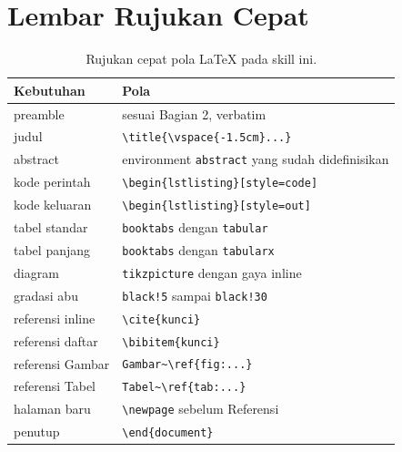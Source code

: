 \documentclass[11pt,a4paper]{article}
\begin{document}
\section{Lembar Rujukan Cepat}

\begin{table}[H]
	\centering
	\caption{Rujukan cepat pola LaTeX pada skill ini.}
	\label{tab:cheat}
	\footnotesize
	\begin{tabularx}{\textwidth}{l X}
		\toprule
		Kebutuhan        & Pola                                                                \\
		\midrule
		preamble         & sesuai Bagian 2, verbatim                                           \\
		judul            & \texttt{\textbackslash title\{\textbackslash vspace\{-1.5cm\}...\}} \\
		abstract         & environment \texttt{abstract} yang sudah didefinisikan              \\
		kode perintah    & \texttt{\textbackslash begin\{lstlisting\}[style=code]}             \\
		kode keluaran    & \texttt{\textbackslash begin\{lstlisting\}[style=out]}              \\
		tabel standar    & \texttt{booktabs} dengan \texttt{tabular}                           \\
		tabel panjang    & \texttt{booktabs} dengan \texttt{tabularx}                          \\
		diagram          & \texttt{tikzpicture} dengan gaya inline                             \\
		gradasi abu      & \texttt{black!5} sampai \texttt{black!30}                           \\
		referensi inline & \texttt{\textbackslash cite\{kunci\}}                               \\
		referensi daftar & \texttt{\textbackslash bibitem\{kunci\}}                            \\
		referensi Gambar & \texttt{Gambar\textasciitilde\textbackslash ref\{fig:...\}}         \\
		referensi Tabel  & \texttt{Tabel\textasciitilde\textbackslash ref\{tab:...\}}          \\
		halaman baru     & \texttt{\textbackslash newpage} sebelum Referensi                   \\
		penutup          & \texttt{\textbackslash end\{document\}}                             \\
		\bottomrule
	\end{tabularx}
\end{table}
\end{document}
